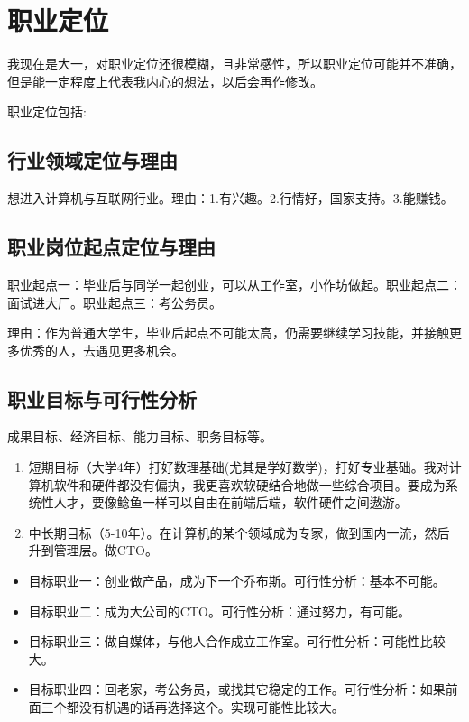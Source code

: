 \documentclass{article}
\begin{document}
\section{职业定位}
我现在是大一，对职业定位还很模糊，且非常感性，所以职业定位可能并不准确，但是能一定程度上代表我内心的想法，以后会再作修改。\par
职业定位包括:\par

\subsection{行业领域定位与理由}
想进入计算机与互联网行业。理由：1.有兴趣。2.行情好，国家支持。3.能赚钱。\par
\subsection{职业岗位起点定位与理由}
职业起点一：毕业后与同学一起创业，可以从工作室，小作坊做起。职业起点二：面试进大厂。职业起点三：考公务员。\par
理由：作为普通大学生，毕业后起点不可能太高，仍需要继续学习技能，并接触更多优秀的人，去遇见更多机会。
\subsection{职业目标与可行性分析}

成果目标、经济目标、能力目标、职务目标等。
\begin{enumerate}[(1)]
	\item 短期目标（大学4年）打好数理基础(尤其是学好数学)，打好专业基础。我对计算机软件和硬件都没有偏执，我更喜欢软硬结合地做一些综合项目。要成为系统性人才，要像鲶鱼一样可以自由在前端后端，软件硬件之间遨游。
	\item 中长期目标（5-10年）。在计算机的某个领域成为专家，做到国内一流，然后升到管理层。做CTO。
\end{enumerate}
\begin{itemize}
    \item 目标职业一：创业做产品，成为下一个乔布斯。可行性分析：基本不可能。
    \item 目标职业二：成为大公司的CTO。可行性分析：通过努力，有可能。
    \item 目标职业三：做自媒体，与他人合作成立工作室。可行性分析：可能性比较大。
    \item 目标职业四：回老家，考公务员，或找其它稳定的工作。可行性分析：如果前面三个都没有机遇的话再选择这个。实现可能性比较大。
\end{itemize}
\end{document}
